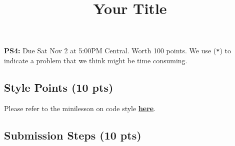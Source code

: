 \documentclass[
  letterpaper,
  DIV=11,
  numbers=noendperiod]{scrartcl}
\title{Your Title}
\author{}
\date{}
\begin{document}
\maketitle



\textbf{PS4:} Due Sat Nov 2 at 5:00PM Central. Worth 100 points. We use
(\texttt{*}) to indicate a problem that we think might be time
consuming.

\subsection{Style Points (10 pts)}\label{style-points-10-pts}

Please refer to the minilesson on code style
\textbf{\href{https://uchicago.zoom.us/rec/share/pG_wQ-pHTQrJTmqNn4rcrw5V194M2H2s-2jdy8oVhWHkd_yZt9o162IWurpA-fxU.BIQlSgZLRYctvzp-}{here}}.

\subsection{Submission Steps (10 pts)}\label{submission-steps-10-pts}
\end{document}
